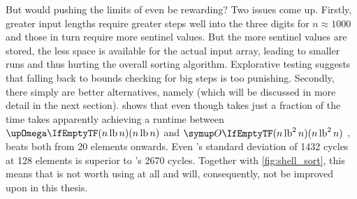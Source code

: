 But would pushing the limits of \ShS{} even be rewarding?
Two issues come up.
Firstly, greater input lengths require greater steps \Dash well into the three digits for \(n \approx 1000\) \cite{skean2023optimization, 10.1007/3-540-44669-9_12} \Dash and those in turn require more sentinel values.
But the more sentinel values are stored, the less space is available for the actual input array, leading to smaller runs and thus hurting the overall sorting algorithm.
Explorative testing suggests that falling back to bounds checking for big steps is too punishing.
Secondly, there simply are better alternatives, namely \QS{} (which will be discussed in more detail in the next section).
 shows that even though \ShS{} takes just a fraction of the time \IS{} takes \Dash apparently achieving a runtime between \(\bigomega{n \lb n}\) and \(\bigoh{n \lb^2 n}\) \Dash\negthinspace, \QS{} beats both from 20 elements onwards.
Even \QS{}'s standard deviation of 1432 cycles at 128 elements is superior to \ShS{}'s 2670 cycles.
Together with \cref{fig:shell_sort}, this means that \ShS{} is not worth using at all and will, consequently, not be improved upon in this thesis.
